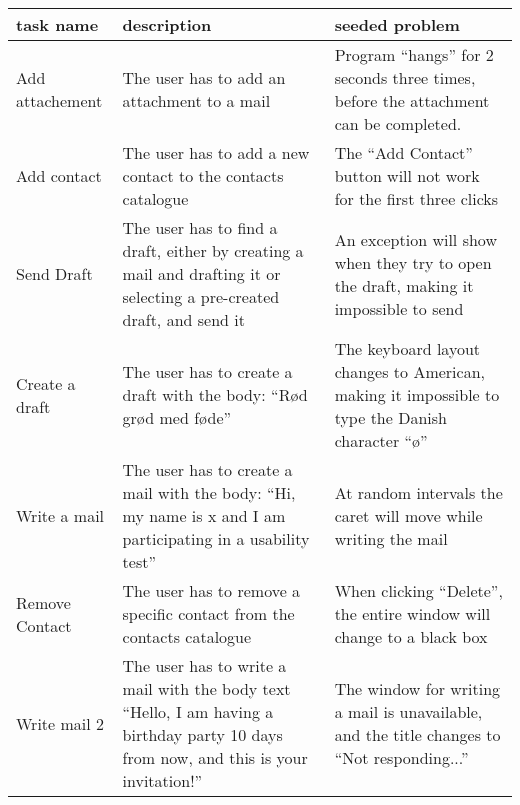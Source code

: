 \begin{table}[h]
  \centering
  \begin{tabular}[c]{|l|p{80pt}|p{80pt}|}
    \hline
    task name                     & description                                                                                                                                    & seeded problem                                                                                           \\ \hline
    \small{Add attachement}       & \small{The user has to add an attachment to a mail}                                                                                            & \small{Program ``hangs'' for 2 seconds three times, before the attachment can be completed.}             \\ \hline
    \small{Add contact}           & \small{The user has to add a new contact to the contacts catalogue}                                                                            & \small{The ``Add Contact'' button will not work for the first three clicks}                              \\ \hline
    \small{Send Draft}            & \small{The user has to find a draft, either by creating a mail and drafting it or selecting a pre-created draft, and send it}                  & \small{An exception will show when they try to open the draft, making it impossible to send}             \\ \hline
    \small{Create a draft}        & \small{The user has to create a draft with the body: ``Rød grød med føde''}                                                                    & \small{The keyboard layout changes to American, making it impossible to type the Danish character ``ø''} \\ \hline
    \small{Write a mail}          & \small{The user has to create a mail with the body: ``Hi, my name is x and I am participating in a usability test''}                           & \small{At random intervals the caret will move while writing the mail}                                   \\ \hline
    \small{Remove Contact}        & \small{The user has to remove a specific contact from the contacts catalogue}                                                                  & \small{When clicking ``Delete'', the entire window will change to a black box}                           \\ \hline
    \small{Write mail 2}          & \small{The user has to write a mail with the body text ``Hello, I am having a birthday party 10 days from now, and this is your invitation!''} & \small{The window for writing a mail is unavailable, and the title changes to ``Not responding...''}     \\ \hline

\end{tabular}
\end{table}
